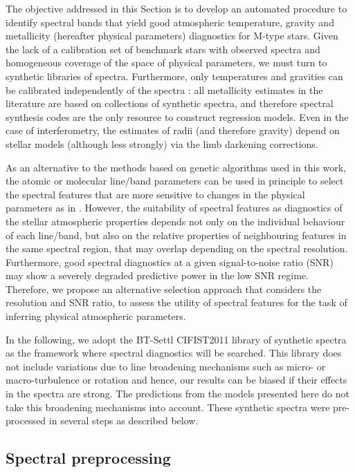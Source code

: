 The objective addressed in this Section is to develop an automated
procedure to identify spectral bands that yield good atmospheric
temperature, gravity and metallicity (hereafter physical parameters)
diagnostics for M-type stars. Given the lack of a calibration set of
benchmark stars with observed spectra and homogeneous coverage of the
space of physical parameters, we must turn to synthetic libraries of
spectra. Furthermore, only temperatures and gravities can be
calibrated independently of the spectra \citep[for example as
in][using interferometry]{2003A&A...397L...5S}: all metallicity
estimates in the literature are based on collections of synthetic
spectra, and therefore spectral synthesis codes are the only resource
to construct regression models. Even in the case of interferometry,
the estimates of radii (and therefore gravity) depend on stellar
models (although less strongly) via the limb darkening corrections.

As an alternative to the methods based on genetic algorithms used in
this work, the atomic or molecular line/band parameters can be used in
principle to select the spectral features that are more sensitive to
changes in the physical parameters as
in \cite{2016A&A...587A..19P}. However, the suitability of spectral
features as diagnostics of the stellar atmospheric properties depends
not only on the individual behaviour of each line/band, but also on
the relative properties of neighbouring features in the same spectral
region, that may overlap depending on the spectral
resolution. Furthermore, good spectral diagnostics at a given
signal-to-noise ratio (SNR) may show a severely degraded predictive
power in the low SNR regime. Therefore, we propose an alternative
selection approach that considers the resolution and SNR ratio, 
to assess the utility of spectral features for the task of
inferring physical atmospheric parameters. 

In the following, we adopt the BT-Settl CIFIST2011 library of
synthetic spectra
\citep{2013MSAIS..24..128A} as the framework where spectral
diagnostics will be searched. This library does not include variations
due to line broadening mechanisms such as micro- or macro-turbulence
or rotation and hence, our results can be biased if their effects in
the spectra are strong. The predictions from the models presented here
do not take this broadening mechanisms into account. These synthetic
spectra were pre-processed in several steps as described below.

\subsection{Spectral preprocessing}

